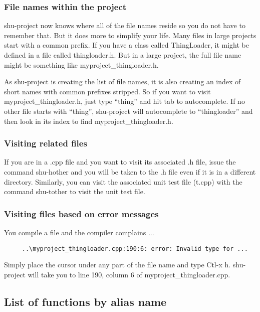 \subsubsection{File names within the project}

shu-project now knows where all of the file names reside so you do not have to
remember that.  But it does more to simplify your life.  Many files in large
projects start with a common prefix.  If you have a class called ThingLoader,
it might be defined in a file called thingloader.h.  But in a large project,
the full file name might be something like myproject\_thingloader.h.

As shu-project is creating the list of file names, it is also creating an
index of short names with common prefixes stripped.  So if you want to visit
myproject\_thingloader.h, just type ``thing'' and hit tab to autocomplete.  If
no other file starts with ``thing'', shu-project will autocomplete to
``thingloader'' and then look in its index to find myproject\_thingloader.h.

\subsubsection{Visiting related files}

If you are in a .cpp file and you want to visit its associated .h file, issue
the command shu-hother and you will be taken to the .h file even if it is in a
different directory.  Similarly, you can visit the associated unit test file
(t.cpp) with the command shu-tother to visit the unit test file.

\subsubsection{Visiting files based on error messages}

You compile a file and the compiler complains ...

\small{\begin{verbatim}
     ..\myproject_thingloader.cpp:190:6: error: Invalid type for ...
\end{verbatim}}

Simply place the cursor under any part of the file name and type Ctl-x h.
shu-project will take you to line 190, column 6 of myproject\_thingloader.cpp.



\subsection{List of functions by alias name}

